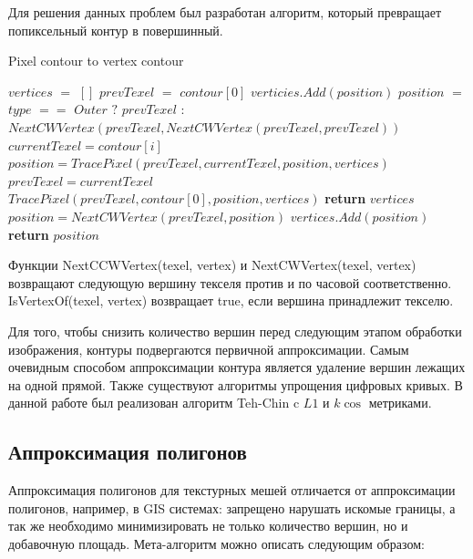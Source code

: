 \documentclass{fefu_thesis/cls/fefu}
\newenvironment{algo}[1][]
  {\begin{algorithm}[#1]
     \selectlanguage{english}
     \floatname{algorithm}{Алгоритм}
  }
  {\end{algorithm}}
\begin{document}
    Для решения данных проблем был разработан алгоритм, который превращает попиксельный контур в повершинный.
    \begin{algo}[H]
        \caption{Pixel contour to vertex contour}
        \begin{algorithmic}[1]
                \State $vertices$ $=$ $[]$
                \State $prevTexel$ $=$ $contour$$[0]$
                    \State $verticies.Add(position)$
                \EndIf
                \State $position$ $=$ $type$ $==$ $Outer$ $?$
                \State $prevTexel$ $:$
                \State $NextCWVertex(prevTexel, NextCWVertex(prevTexel, prevTexel))$
                    \State $currentTexel = contour[i]$
                    \State $position = TracePixel(prevTexel, currentTexel, position, vertices)$
                    \State $prevTexel = currentTexel$
                \EndFor
                \State $TracePixel(prevTexel, contour[0], position, vertices)$
                \State \textbf{return} $vertices$
            \EndProcedure
                \Do
                    \State $position = NextCWVertex(prevTexel, position)$
                    \State $vertices.Add(position)$
                \State \textbf{return} $position$
            \EndProcedure
        \end{algorithmic}
    \end{algo}

    Функции NextCCWVertex(texel, vertex) и NextCWVertex(texel, vertex) возвращают следующую вершину текселя против и по часовой соответственно. IsVertexOf(texel, vertex) возвращает true, если вершина принадлежит текселю.

    Для того, чтобы снизить количество вершин перед следующим этапом обработки изображения, контуры подвергаются первичной аппроксимации. Самым очевидным способом аппроксимации контура является удаление вершин лежащих на одной прямой. Также существуют алгоритмы упрощения цифровых кривых. В данной работе был реализован алгоритм Teh-Chin\cite{TehChin} c $L1$ и $k\cos$ метриками.

    \subsection{Аппроксимация полигонов}
    Аппроксимация полигонов для текстурных мешей отличается от аппроксимации полигонов, например, в GIS системах: запрещено нарушать искомые границы, а так же необходимо минимизировать не только количество вершин, но и добавочную площадь. Мета-алгоритм можно описать следующим образом:
\end{document}
